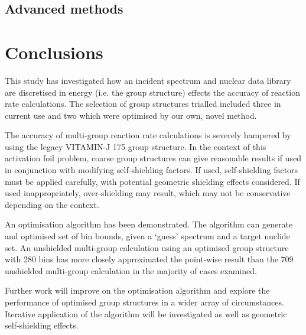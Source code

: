 \subsection{Advanced methods}


\section{Conclusions}

This study has investigated how an incident spectrum and nuclear data library are discretised in energy (i.e. the group structure) effects the accuracy of reaction rate calculations. The selection of group structures trialled included three in current use and two which were optimised by our own, novel method.

The accuracy of multi-group reaction rate calculations is severely hampered by using the legacy VITAMIN-J 175 group structure. In the context of this activation foil problem, coarse group structures can give reasonable results if used in conjunction with modifying self-shielding factors. If used, self-shielding factors must be applied carefully, with potential geometric shielding effects considered. If used inappropriately, over-shielding may result, which may not be conservative depending on the context.

An optimisation algorithm has been demonstrated. The algorithm can generate and optimised set of bin bounds, given a `guess' spectrum and a target nuclide set. An unshielded multi-group calculation using an optimised group structure with 280 bins has more closely approximated the point-wise result than the 709 unshielded multi-group calculation in the majority of cases examined.

Further work will improve on the optimisation algorithm and explore the performance of optimised group structures in a wider array of circumstances. Iterative application of the algorithm will be investigated as well as geometric self-shielding effects. 

